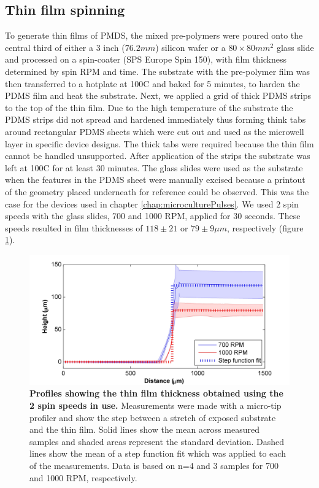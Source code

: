         \subsection{Thin film spinning}
        To generate thin films of PMDS, the mixed pre-polymers were poured onto the central third of either a 3 inch (\(76.2mm\)) silicon wafer or a \(80\times 80 mm^{2}\) glass slide and processed on a spin-coater (SPS Europe Spin 150), with film thickness determined by spin RPM and time. The substrate with the pre-polymer film was then transferred to a hotplate at 100\degree C and baked for 5 minutes, to harden the PDMS film and heat the substrate. Next, we applied a grid of thick PDMS strips to the top of the thin film. Due to the high temperature of the substrate the PDMS strips did not spread and hardened immediately thus forming think tabs around rectangular PDMS sheets which were cut out and used as the microwell layer in specific device designs. The thick tabs were required because the thin film cannot be handled unsupported. After application of the strips the substrate was left at 100\degree C for at least 30 minutes. The glass slides were used as the substrate when the features in the PDMS sheet were manually excised because a printout of the geometry placed underneath for reference could be observed. This was the case for the devices used in chapter \ref{chap:microculturePulses}. We used 2 spin speeds with the glass slides, 700 and 1000 RPM, applied for 30 seconds. These speeds resulted in film thicknesses of \(118\pm 21\) or \(79\pm 9\mu m\), respectively (figure \ref{fig:methods:profiles}).
        \begin{figure}[h]
            \includegraphics[width=14cm]{chapter2/figures/profiles/spin_profiles.jpg}

            \caption[Profiling of PDMS thin film thicknesses]{\textbf{Profiles showing the thin film thickness obtained using the 2 spin speeds in use.} Measurements were made with a micro-tip profiler and show the step between a stretch of exposed substrate and the thin film. Solid lines show the mean across measured samples and shaded areas represent the standard deviation. Dashed lines show the mean of a step function fit which was applied to each of the measurements. Data is based on n=4 and 3 samples for 700 and 1000 RPM, respectively.}
            \label{fig:methods:profiles}
        \end{figure}
